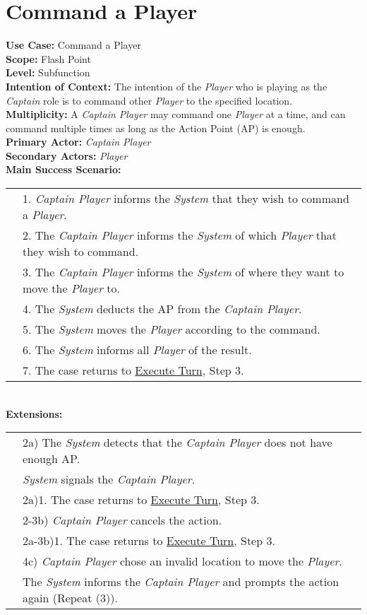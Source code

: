 \documentclass{article}
\begin{document}
	\section*{Command a Player}
	\textbf{Use Case:} Command a Player\\
	\textbf{Scope:} Flash Point\\
	\textbf{Level:} Subfunction\\
	\textbf{Intention of Context:} The intention of the \textit{Player} who is playing as the \textit{Captain} role is to command other \textit{Player} to the specified location.\\
	\textbf{Multiplicity: }A \textit{Captain Player} may command one \textit{Player} at a time, and can command multiple times as long as the Action Point (AP) is enough.\\
	\textbf{Primary Actor:} \textit{Captain Player}\\
	\textbf{Secondary Actors:} \textit{Player}\\
	\textbf{Main Success Scenario:}\\
	\begin{tabular}{l l}
		&1. \textit{Captain Player} informs the \textit{System} that they wish to command a \textit{Player}.\\
		&2. The \textit{Captain Player} informs the \textit{System} of which \textit{Player} that they wish to command.\\
		&3. The \textit{Captain Player} informs the \textit{System} of where they want to move the \textit{Player} to.\\
		&4. The \textit{System} deducts the AP from the \textit{Captain Player}.\\
		&5. The \textit{System} moves the \textit{Player} according to the command.\\
		&6. The \textit{System} informs all \textit{Player} of the result.\\
		&7. The case returns to \underline{Execute Turn}, Step 3.
	\end{tabular}\\
	\textbf{Extensions:}\\
	\begin{tabular}{l l}
		&2a) The \textit{System} detects that the \textit{Captain Player} does not have enough AP.\\ &\qquad\textit{System} signals the \textit{Captain Player}.\\
		&\qquad2a)1. The case returns to \underline{Execute Turn}, Step 3.\\
		&2-3b) \textit{Captain Player} cancels the action.\\
		&\qquad2a-3b)1. The case returns to \underline{Execute Turn}, Step 3.\\
		&4c) \textit{Captain Player} chose an invalid location to move the \textit{Player}.\\
		&\qquad The \textit{System} informs the \textit{Captain Player} and prompts the action again (Repeat (3)).
	\end{tabular}\\
	
\end{document}
